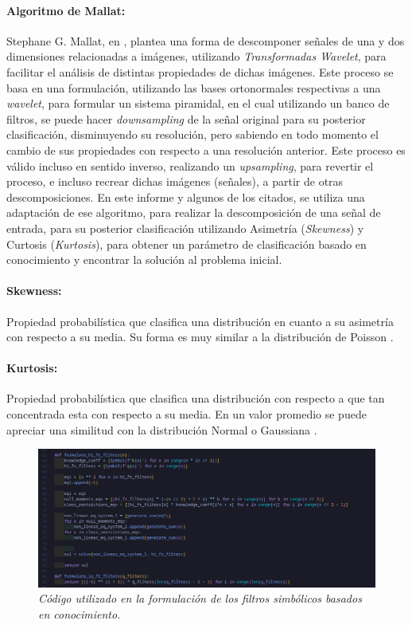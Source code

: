 \documentclass[11pt]{article}
\begin{document}
\paragraph*{Algoritmo de Mallat:}
Stephane G. Mallat, en \cite{mallat}, plantea una forma de descomponer señales de una y dos dimensiones relacionadas a imágenes, utilizando {\it Transformadas Wavelet}, para facilitar el análisis 
de distintas propiedades de dichas imágenes. Este proceso se basa en una formulación, utilizando las bases ortonormales respectivas a una {\it wavelet}, para formular un sistema piramidal, en el cual utilizando un banco de filtros, se puede 
hacer {\it downsampling} de la señal original para su posterior clasificación, disminuyendo su resolución, pero sabiendo en todo momento el cambio de sus propiedades con respecto a una resolución anterior. Este proceso es válido incluso en sentido inverso, realizando un {\it upsampling}, para 
revertir el proceso, e incluso recrear dichas imágenes (señales), a partir de otras descomposiciones. En este informe y algunos de los citados, se utiliza una adaptación de ese algoritmo, para realizar la descomposición de una señal de entrada, para su posterior clasificación utilizando 
Asimetría ({\it Skewness}) y Curtosis ({\it Kurtosis}), para obtener un parámetro de clasificación basado en conocimiento y encontrar la solución al problema inicial.

\paragraph*{Skewness:}
Propiedad probabilística que clasifica una distribución en cuanto a su asimetría con respecto a su media. Su forma es muy similar a la distribución de Poisson \cite{skew}.

\paragraph*{Kurtosis:}
Propiedad probabilística que clasifica una distribución con respecto a que tan concentrada esta con respecto a su media. En un valor promedio se puede apreciar una similitud con la distribución Normal o Gaussiana \cite{kurt}.

\pagebreak

\begin{figure}
    \includegraphics[width=\textwidth]{filters}
    \caption{\it Código utilizado en la formulación de los filtros simbólicos basados en conocimiento.}
\end{figure}
\end{document}
